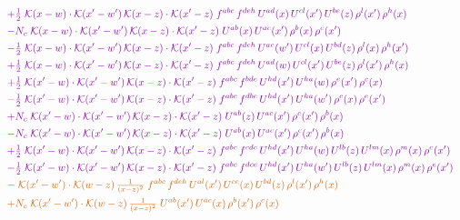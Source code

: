 \documentclass[10pt]{article}
\numberwithin{equation}{section}
\begin{document}
\begin{align}
&\quad{\color{CC}+\tfrac{1}{2}\;\mathcal{K}(x-w)\cdot\mathcal{K}(x'-w')\,\mathcal{K}(x-z)\cdot\mathcal{K}(x'-z)\;f^{abc}\,f^{deh}\,U^{ad}(x)\,U^{cl}(x')\,U^{be}(z)\,\rho^{l}(x')\,\rho^{h}(x)}\notag\\
&\quad{\color{CC}-N_c\;\mathcal{K}(x-w)\cdot\mathcal{K}(x'-w')\,\mathcal{K}(x-z)\cdot\mathcal{K}(x'-z)\;U^{ab}(x)\,U^{ac}(x')\,\rho^{b}(x)\,\rho^{c}(x')}\notag\\
&\quad{\color{CC}-\tfrac{1}{2}\;\mathcal{K}(x-w)\cdot\mathcal{K}(x'-w')\,\mathcal{K}(x-z)\cdot\mathcal{K}(x'-z)\;f^{abc}\,f^{deh}\,U^{ae}(w')\,U^{cl}(x)\,U^{bd}(z)\,\rho^{l}(x)\,\rho^{h}(x')}\notag\\
&\quad{\color{CC}+\tfrac{1}{2}\;\mathcal{K}(x-w)\cdot\mathcal{K}(x'-w')\,\mathcal{K}(x-z)\cdot\mathcal{K}(x'-z)\;f^{abc}\,f^{deh}\,U^{ad}(w)\,U^{cl}(x')\,U^{be}(z)\,\rho^{l}(x')\,\rho^{h}(x)}\notag\\
&\quad{\color{CC}+\tfrac{1}{2}\;\mathcal{K}(x'-w)\cdot\mathcal{K}(x'-w')\,\mathcal{K}(x-z)\cdot\mathcal{K}(x'-z)\;f^{abc}\,f^{bde}\,U^{hd}(x')\,U^{ha}(w)\,\rho^{e}(x')\,\rho^{c}(x)}\notag\\
&\quad{\color{CC}-\tfrac{1}{2}\;\mathcal{K}(x'-w)\cdot\mathcal{K}(x'-w')\,\mathcal{K}(x-z)\cdot\mathcal{K}(x'-z)\;f^{abc}\,f^{dbe}\,U^{hd}(x')\,U^{ha}(w')\,\rho^{c}(x)\,\rho^{e}(x')}\notag\\
&\quad{\color{CC}+N_c\;\mathcal{K}(x'-w)\cdot\mathcal{K}(x'-w')\,\mathcal{K}(x-z)\cdot\mathcal{K}(x'-z)\;U^{ab}(z)\,U^{ac}(x')\,\rho^{c}(x')\,\rho^{b}(x)}\notag\\
&\quad{\color{CC}-N_c\;\mathcal{K}(x'-w)\cdot\mathcal{K}(x'-w')\,\mathcal{K}(x-z)\cdot\mathcal{K}(x'-z)\;U^{ab}(x)\,U^{ac}(x')\,\rho^{c}(x')\,\rho^{b}(x)}\notag\\
&\quad{\color{CC}+\tfrac{1}{2}\;\mathcal{K}(x'-w)\cdot\mathcal{K}(x'-w')\,\mathcal{K}(x-z)\cdot\mathcal{K}(x'-z)\;f^{abc}\,f^{cde}\,U^{hd}(x')\,U^{ha}(w)\,U^{lb}(z)\,U^{lm}(x)\,\rho^{m}(x)\,\rho^{e}(x')}\notag\\
&\quad{\color{CC}-\tfrac{1}{2}\;\mathcal{K}(x'-w)\cdot\mathcal{K}(x'-w')\,\mathcal{K}(x-z)\cdot\mathcal{K}(x'-z)\;f^{abc}\,f^{dce}\,U^{hd}(x')\,U^{ha}(w')\,U^{lb}(z)\,U^{lm}(x)\,\rho^{m}(x)\,\rho^{e}(x')}\notag\\
&\quad{\color{BFK}-\;\mathcal{K}(x'-w')\cdot\mathcal{K}(w-z)\,\tfrac{1}{(x-z)^{2}}\;f^{abc}\,f^{deh}\,U^{al}(x')\,U^{ce}(x)\,U^{bd}(z)\,\rho^{l}(x')\,\rho^{h}(x)}\notag\\
&\quad{\color{BFK}+N_c\;\mathcal{K}(x'-w')\cdot\mathcal{K}(w-z)\,\tfrac{1}{(x-z)^{2}}\;U^{ab}(x')\,U^{ac}(x)\,\rho^{b}(x')\,\rho^{c}(x)}\notag\\

\end{align}
\end{document}

